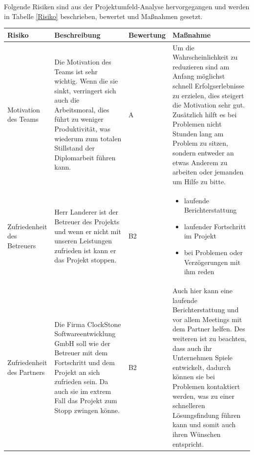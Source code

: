 Folgende Risiken sind aus der Projektumfeld-Analyse hervorgegangen und werden in Tabelle \ref{Risiko} beschrieben, bewertet und Maßnahmen gesetzt.

	\begin{table}[H]
			\centering
		\renewcommand{\arraystretch}{1.5}
		\begin{tabular}{|p{3cm}|p{5cm}|p{2cm}|p{5cm}|}
			\hline
			\textbf{Risiko} & \textbf{Beschreibung} & \textbf{Bewertung} & \textbf{Maßnahme} \\
			\hline
			Motivation des Teams & Die Motivation des Teams ist sehr wichtig. Wenn die sie sinkt, verringert sich auch die Arbeitsmoral, dies führt zu weniger Produktivität, was wiederum zum totalen Stillstand der Diplomarbeit führen kann. & A & Um die Wahrscheinlichkeit zu reduzieren sind am Anfang möglichst schnell Erfolgserlebnisse zu erzielen, dies steigert die Motivation sehr gut. Zusätzlich hilft es bei Problemen nicht Stunden lang am Problem zu sitzen, sondern entweder an etwas Anderem zu arbeiten oder jemanden um Hilfe zu bitte.\\
			\hline
			Zufriedenheit des Betreuers & Herr Landerer ist der Betreuer des Projekts und wenn er nicht mit unseren Leistungen zufrieden ist kann er das Projekt stoppen. & B2 & \begin{itemize}
				\item laufende Berichterstattung
				\item laufender Fortschritt im Projekt
				\item bei Problemen oder Verzögerungen mit ihm reden
			\end{itemize}\\
		\hline
		Zufriedenheit des Partners & Die Firma ClockStone Softwareentwicklung GmbH soll wie der Betreuer mit dem Fortschritt und dem Projekt an sich zufrieden sein. Da auch sie im extrem Fall das Projekt zum Stopp zwingen könne. & B2 & Auch hier kann eine laufende Berichterstattung und vor allem Meetings mit dem Partner helfen. Des weiteren ist zu beachten, dass auch ihr Unternehmen Spiele entwickelt, dadurch können sie bei Problemen kontaktiert werden, was zu einer schnelleren Lösungsfindung führen kann und somit auch ihren Wünschen entspricht.\\
		 \hline
		\end{tabular}
	\end{table}
\newpage

